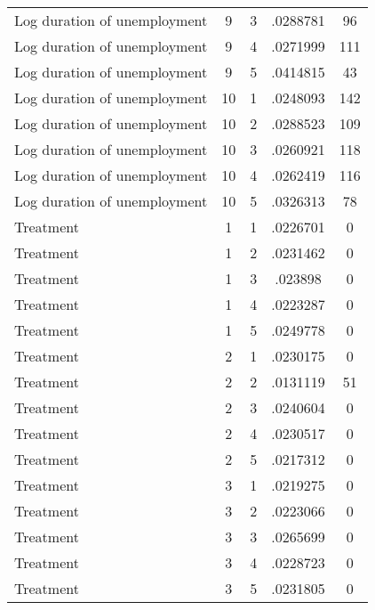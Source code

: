 \begin{tabular}{l*{4}{c}}
Log duration of unemployment&           9&           3&    .0288781&          96\\
Log duration of unemployment&           9&           4&    .0271999&         111\\
Log duration of unemployment&           9&           5&    .0414815&          43\\
Log duration of unemployment&          10&           1&    .0248093&         142\\
Log duration of unemployment&          10&           2&    .0288523&         109\\
Log duration of unemployment&          10&           3&    .0260921&         118\\
Log duration of unemployment&          10&           4&    .0262419&         116\\
Log duration of unemployment&          10&           5&    .0326313&          78\\
Treatment           &           1&           1&    .0226701&           0\\
Treatment           &           1&           2&    .0231462&           0\\
Treatment           &           1&           3&     .023898&           0\\
Treatment           &           1&           4&    .0223287&           0\\
Treatment           &           1&           5&    .0249778&           0\\
Treatment           &           2&           1&    .0230175&           0\\
Treatment           &           2&           2&    .0131119&          51\\
Treatment           &           2&           3&    .0240604&           0\\
Treatment           &           2&           4&    .0230517&           0\\
Treatment           &           2&           5&    .0217312&           0\\
Treatment           &           3&           1&    .0219275&           0\\
Treatment           &           3&           2&    .0223066&           0\\
Treatment           &           3&           3&    .0265699&           0\\
Treatment           &           3&           4&    .0228723&           0\\
Treatment           &           3&           5&    .0231805&           0\\

\end{tabular}
